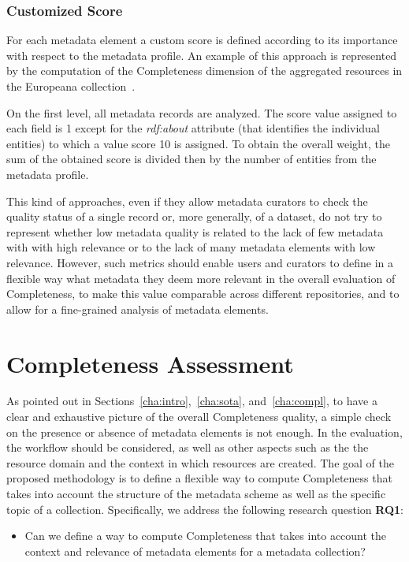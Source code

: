 \documentclass[epsfig,a4paper,12pt,titlepage]{book}
\begin{document}
\subsubsection{Customized Score}
For each metadata element a custom score is defined according to its importance with respect to the metadata profile. An example of this approach is represented by the computation of the Completeness dimension of the aggregated resources in the Europeana collection~\cite{kiraly2015metadata}. 


On the first level, all metadata records are analyzed. The score value assigned to each field is 1 except for the \textit{rdf:about} attribute (that identifies the individual entities) to which a value score 10 is assigned. To obtain the overall weight, the sum of the obtained score is divided then by the number of entities from the metadata profile.

This kind of approaches, even if they allow metadata curators to check the quality status of a single record or, more generally, of a dataset, do not try to represent whether low metadata quality is related to the lack of few metadata with with high relevance or to the lack of many metadata elements with low relevance. However,  such metrics should enable users and curators to define in a flexible way what metadata they deem more relevant in the overall evaluation of Completeness, to make this value comparable across different repositories, and to allow for a fine-grained analysis of metadata elements. 

\section{Completeness Assessment}
\label{sec:compassess}
As pointed out in Sections~\ref{cha:intro},~\ref{cha:sota}, and~\ref{cha:compl}, to have a clear and exhaustive picture of the overall Completeness quality, a simple check on the presence or absence of metadata elements is not enough. In the evaluation, the workflow should be considered, as well as other aspects such as the the resource domain and the context in which resources are created. The goal of the proposed methodology is to define a flexible way to compute Completeness that takes into account the structure of the metadata scheme as well as the specific topic of a collection. Specifically, we address the following research question \textbf{RQ1}: 
\begin{itemize}
    \item Can we define a way to compute Completeness that takes into account the context and relevance of metadata elements for a metadata collection? 
\end{itemize}
\end{document}
